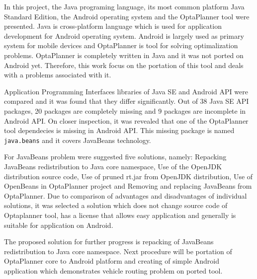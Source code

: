 In this project, the Java programing language, its most common platform Java Standard Edition, the Android operating system and the OptaPlanner tool were presented. Java is cross-platform language which is used for application development for Android operating system. Android is largely used as primary system for mobile devices and OptaPlanner is tool for solving optimalization problems. OptaPlanner is completely written in Java and it was not ported on Android yet. Therefore, this work focus on the portation of this tool and deals with a problems associated with it.

Application Programming Interfaces libraries of Java SE and Android API were compared and it was found that they differ significantly. Out of 38 Java SE API packages, 20 packages are completely missing and 9 packages are incomplete in Android API. On closer inspection, it was revealed that one of the OptaPlanner tool dependecies is missing in Android API. This missing package is named \texttt{java.beans} and it covers JavaBeans technology.

For JavaBeans problem were suggested five solutions, namely: Repacking JavaBeans redistribution to Java core namespace, Use of the OpenJDK distribution source code, Use of pruned rt.jar from OpenJDK distribution, Use of OpenBeans in OptaPlanner project and Removing and replacing JavaBeans from OptaPlanner. Due to comparison of advantages and disadvantages of individual solutions, it was selected a solution which does not change source code of Optaplanner tool, has a license that allows easy application and generally is suitable for application on Android.

The proposed solution for further progress is repacking of JavaBeans redistribution to Java core namespace. Next procedure will be portation of OptaPlanner core to Android platform and creating of simple Android application which demonstrates vehicle routing problem on ported tool. 
